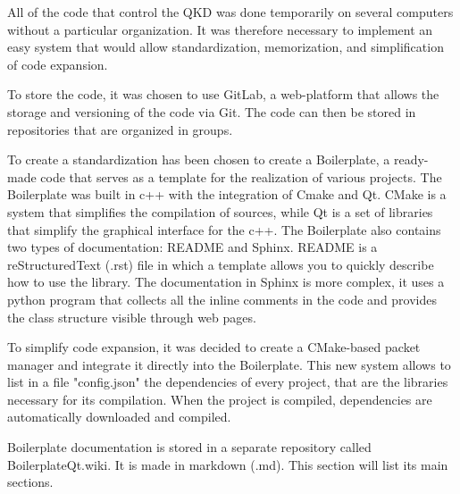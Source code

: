 All of the code that control the QKD was done temporarily on several computers without a particular organization. It was therefore necessary to implement an easy system that would allow standardization, memorization, and simplification of code expansion.

To store the code, it was chosen to use GitLab, a web-platform that allows the storage and versioning of the code via Git. The code can then be stored in repositories that are organized in groups.

To create a standardization has been chosen to create a Boilerplate, a ready-made code that serves as a template for the realization of various projects. The Boilerplate was built in c++ with the integration of Cmake and Qt.
CMake is a system that simplifies the compilation of sources, while Qt is a set of libraries that simplify the graphical interface for the c++. The Boilerplate also contains two types of documentation: README and Sphinx.
README is a reStructuredText (.rst) file in which a template allows you to quickly describe how to use the library.
The documentation in Sphinx is more complex, it uses a python program that collects all the inline comments in the code and provides the class structure visible through web pages.

To simplify code expansion, it was decided to create a CMake-based packet manager and integrate it directly into the Boilerplate. This new system allows to list in a file "config.json" the dependencies of every project, that are the libraries necessary for its compilation.
When the project is compiled, dependencies are automatically downloaded and compiled.

Boilerplate documentation is stored in a separate repository called BoilerplateQt.wiki. It is made in markdown (.md). This section will list its main sections.







